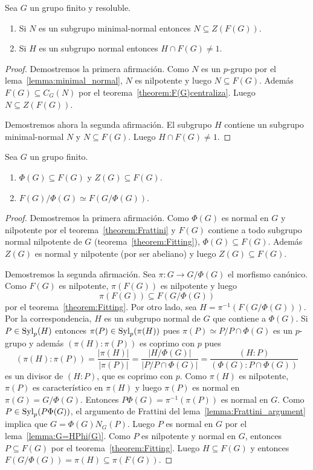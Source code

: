 \begin{corollary}
	Sea $G$ un grupo finito y resoluble. 
	\begin{enumerate}
		\item Si $N$ es un subgrupo minimal-normal entonces $N\subseteq
			Z(F(G))$. 
		\item Si $H$ es un subgrupo normal entonces $H\cap F(G)\ne 1$.
	\end{enumerate}
\end{corollary}

\begin{proof}
	Demostremos la primera afirmación. Como $N$ es un $p$-grupo por el
	lema~\ref{lemma:minimal_normal}, $N$ es nilpotente y luego $N\subseteq
	F(G)$. 	Además $F(G)\subseteq C_G(N)$ por el
	teorema~\ref{theorem:F(G)centraliza}.  Luego $N\subseteq Z(F(G))$. 

	Demostremos ahora la segunda afirmación. El subgrupo $H$ contiene un
	subgrupo minimal-normal $N$ y $N\subseteq F(G)$. Luego $H\cap F(G)\ne1$. 
\end{proof}

\begin{theorem}
	Sea $G$ un grupo finito.
	\begin{enumerate}
		\item $\Phi(G)\subseteq F(G)$ y $Z(G)\subseteq F(G)$.
		\item $F(G)/\Phi(G)\simeq F(G/\Phi(G))$.
	\end{enumerate}
\end{theorem}

\begin{proof}
	Demostremos la primera afirmación. Como $\Phi(G)$ es normal en $G$ y
	nilpotente por el teorema~\ref{theorem:Frattini} y $F(G)$ contiene a todo
	subgrupo normal nilpotente de $G$ (teorema~\ref{theorem:Fitting}),
	$\Phi(G)\subseteq F(G)$. Además $Z(G)$ es normal y nilpotente (por ser
	abeliano) y luego $Z(G)\subseteq F(G)$.

	Demostremos la segunda afirmación. Sea $\pi\colon G\to G/\Phi(G)$ el
	morfismo canónico. Como $F(G)$ es nilpotente, $\pi(F(G))$ es nilpotente y
	luego 
	\[
	\pi(F(G))\subseteq F(G/\Phi(G))
	\]
	por el teorema~\ref{theorem:Fitting}. Por otro lado, sea
	$H=\pi^{-1}(F(G/\Phi(G)))$. Por la correspondencia, $H$ es un subgrupo
	normal de $G$ que contiene a $\Phi(G)$. Si $P\in\mathrm{Syl}_p(H)$ entonces
	$\pi(P)\in\mathrm{Syl}_p(\pi(H))$ pues $\pi(P)\simeq P/P\cap \Phi(G)$ es un
	$p$-grupo y además $(\pi(H):\pi(P))$ es coprimo con $p$ pues 
	\[
	(\pi(H):\pi(P))
	=\frac{|\pi(H)|}{|\pi(P)|}
	=\frac{|H/\Phi(G)|}{|P/P\cap \Phi(G)|}
	=\frac{(H:P)}{(\Phi(G):P\cap\Phi(G))}
	\]
	es un divisor de $(H:P)$, que es coprimo con $p$. Como $\pi(H)$ es
	nilpotente, $\pi(P)$ es característico en $\pi(H)$ y luego $\pi(P)$ es
	normal en $\pi(G)=G/\Phi(G)$. Entonces $P\Phi(G)=\pi^{-1}(\pi(P))$ es
	normal en $G$. Como $P\in\mathrm{Syl}_p(P\Phi(G))$, el argumento de Frattini del
	lema~\ref{lemma:Frattini_argument} implica que $G=\Phi(G)N_G(P)$. Luego $P$
	es normal en $G$ por el lema~\ref{lemma:G=HPhi(G)}. Como $P$ es nilpotente
	y normal en $G$, entonces $P\subseteq F(G)$ por el
	teorema~\ref{theorem:Fitting}. Luego $H\subseteq F(G)$ y entonces
	$F(G/\Phi(G))=\pi(H)\subseteq \pi(F(G))$.
\end{proof}

